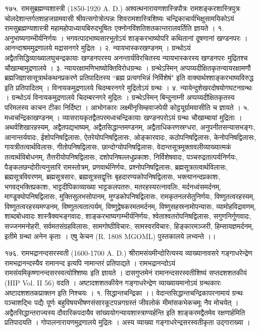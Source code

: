 १७५. रामसुब्रह्मण्यशास्त्री (1850-1920 A. D.)
अश्वत्थनारायणशास्त्रिपौत्रः रामशङ्करशास्त्रिपुत्रः चोलदेशान्तर्गतशाहजग्रामवासी श्रीवत्सगोत्रोत्पन्नः शिवरामशास्त्रिशिष्यः चन्द्रिकाचार्यभिक्षुसामयिकोऽयं रामसुब्रह्मण्यशास्त्री महामहोपाध्यायबिरुदभूषितः एक्नोनविंशतिशतकान्तरालवर्तिति ज्ञायते ।
१. अनुभाष्यगाम्भीर्यनिर्णयः । भगवत्पादभाष्यसारभूतोऽयं शाङ्करभाष्योपरि कथितानां दूषणानां खण्डनपरः । आनन्दाश्रममुद्रणालये मद्रासनगरे मुद्रितः ।
२. न्यायभास्करखण्डनम् । ग्रन्थोऽयं अद्वैतसिद्धिव्याख्यालघुचन्द्रकायाः खण्डनपरस्य अनन्तार्यविरचितस्य न्यायभास्करस्य खण्डनपरः मुद्रितश्च चौखाम्बामुद्रणालये ।
३. न्यायरक्षामणिभाष्योक्तिविरोधग्रन्थः । ग्रन्थेऽस्मिन् अप्पय्यदीक्षितकृतन्यायरक्षामणौ ब्रह्मजिज्ञासासूत्रार्थकथनप्रकरणे प्रतिपादितस्य ``ब्रह्म प्रत्यगभिन्नं निर्विशेषं" इति वाक्यार्थश्शाङ्करभाष्यविरुद्ध इति प्रतिपादितम् । विनायकमुद्रणालये चिदम्बरनगरे मुद्रितोऽयं ग्रन्थः ।
४. न्यायेन्दुशेखरदोषयोगघटनग्रन्थः । ग्रन्थोऽयं विनायकमुद्रणालये चिदम्बरनगरे मुद्रितः । ग्रन्थेऽस्मिन् बिन्दुनाम्नी अप्पय्यदीक्षितकृतस्य परिमलस्य काचन टीका निर्दिष्टा । आभोगकारः लक्ष्मीनृसिम्हवाजपेयी कोट्टयूर्ग्रामवासीति च ज्ञायते ।
५. मध्वचन्द्रिकाखण्डनम् । व्यासरायकृतद्वैतपरमध्वचन्द्रिकायाः खण्डनपरोऽयं ग्रन्थः चौखाम्बायां मुद्रिताः ।
अथर्वशिखारहस्यम्, अद्वैतपद्यभाष्यम्, अद्वैतसिद्धान्तमण्डनम्, अद्वैताधिकरणस्रग्धरा, अनुपनीतसन्यासभङ्गः, आनान्तर्यवादः, ईशोपनिषद्विलासः, ऐतरेयोपनिषद्विलासः, ओङ्कारवादः, कठोपनिषद्विलासः, केनोपनिषद्विलासः, गायत्रीतत्वार्थविलासः, गीतोपनिषद्विलासः, छान्दोग्योपनिषद्विलासः, वेदान्तसूत्रमूक्तावलीव्याख्यात्मकं तत्वार्थविबोधनम्, तैत्तरीयोपनिषद्विलासः, दशोपनिषल्लधुप्रकाशः, निर्विशेषवादः, पञ्चरुद्रतात्पर्यनिर्णयः, पैङ्कलछन्दोरीत्यनुसारि रामस्तोत्रम्, प्रणवार्थनिर्णयः, प्रश्नोपनिषद्विलासः, ब्रह्मसूत्रतत्वार्थविलासः, ब्रह्मसूत्रविवरणम्, ब्रह्मसूत्रसारः, ब्रह्मसूत्रसद्वृत्तिः बृहदारण्यकोपनिषद्विलासः, भक्त्यानन्दप्रकाशः, भगवद्भक्तिप्रकाशः, भाट्टदीपिकाव्याख्या भाट्टकलपतरुः, मतरहस्यरत्नावलिः, मर्दनध्वंसमर्दनम्, माण्डूक्योपनिषद्विलासः, मुक्तिसुलभसोपानम्, मुण्डकोपनिषद्विलासः, रामकृतनलसेतुनिर्णयः, विष्णुतत्वरहस्यम्, विष्णुतत्वरहस्यमण्डनम्, विष्णुतत्वतात्पर्यम्, विष्णुद्वेषकरमतमर्दनम्, विष्णुसहस्रनामोपन्यासः, व्यामोहविद्रावणम्, शाब्दबोधवादः शास्त्रैक्यभङ्गवादः, शाङ्करभाष्यगाम्भीर्यनिर्णयः, श्वेताश्वतरोपनिषद्विलासः, सगुणनिर्गुणवादः, सज्जनमनोहरी, सर्वमतसंग्रहविलासः, सामगोष्ठीविचारः, सामस्वरविचारः, हिङ्कारमञ्जरी, हिम्सायज्ञमर्दनम्, इतीमे ग्रन्था अनेन कृताः । एषु केचन (R. 1808 MGOML) पुस्तकालये लभ्यन्ते ।।

१७६. रामभद्रानन्दसरस्वती (1600-1700 A. D.)
श्रीरामसंयमीन्दोरित्यस्य व्याख्यानावसरे गङ्गाधरेन्द्रेण रामभद्रानन्दस्यैव रामानन्द इत्यपि नामान्तरं प्रतिपाद्यते । रामभद्रानन्दोऽयं रामसंयमिकृष्णानन्दसरस्वत्योश्शिष्यः इति ज्ञायते । दासगुप्तमेनं रामानन्दसरस्वतीशिष्यं सप्तदशशतकीयं (HIP Vol. II 56) वदति । अष्टादशशतकीयेन गङ्गाधरेन्द्रेण व्याख्यायमानोऽयं ग्रन्थकारः अष्टादशशतकप्राक्तन इति निश्चयः ।
१. सिद्धान्तचन्द्रिका ।। वेदान्तसिद्धान्तचन्द्रिकापरनामायं ग्रन्थः पञ्चाशद्भिः पद्यैः पूर्णः बहुविषयभीषणसंसारकूटपन्नगग्रस्तं जीवलोकं मीमांसकभेकचमूः नैव मोचयेत् । अद्वैतसिद्धान्तराज्यस्य दौवारिकपदायैव सांख्ययोगन्यायशास्त्राण्यर्हन्ति इति शाङ्करमद्वैतमेव रक्षणार्हमिति प्रतिपादयति । गोपालनारायणमुद्रणालये मुद्रितः । अस्य व्याख्या गङ्गाधरेन्द्रसरस्वतीकृता उद्गाराख्या ।

